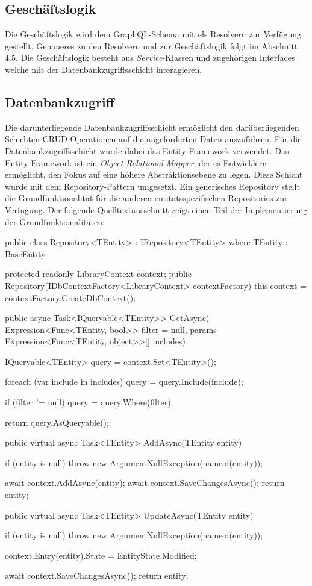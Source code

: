 \subsection{Geschäftslogik}
Die Geschäftslogik wird dem GraphQL-Schema mittels Resolvern zur Verfügung gestellt.
Genaueres zu den Resolvern und zur Geschäftslogik folgt im Abschnitt 4.5.
Die Geschäftslogik besteht aus \textit{Service}-Klassen und zugehörigen Interfaces welche mit der Datenbankzugriffsschicht interagieren.

\subsection{Datenbankzugriff}
Die darunterliegende Datenbankzugriffsschicht ermöglicht den darüberliegenden Schichten CRUD-Operationen auf die angeforderten Daten auszuführen.
Für die Datenbankzugriffsschicht wurde dabei das Entity Framework verwendet.
Das Entity Framework ist ein \textit{Object Relational Mapper}, der es Entwicklern ermöglicht, den Fokus auf eine höhere Abstraktionsebene zu legen.
Diese Schicht wurde mit dem Repository-Pattern umgesetzt.
Ein generisches Repository stellt die Grundfunktionalität für die anderen entitätsspezifischen Repositories zur Verfügung.
Der folgende Quelltextausschnitt zeigt einen Teil der Implementierung der Grundfunktionalitäten:
\begin{JsCode}
public class Repository<TEntity> : IRepository<TEntity> where TEntity : BaseEntity {
    protected readonly LibraryContext context;
    public Repository(IDbContextFactory<LibraryContext> contextFactory) {
        this.context = contextFactory.CreateDbContext();
    }

    public async Task<IQueryable<TEntity>> GetAsync(
        Expression<Func<TEntity, bool>> filter = null,
        params Expression<Func<TEntity, object>>[] includes)
    {
        IQueryable<TEntity> query = context.Set<TEntity>();

        foreach (var include in includes) {
            query = query.Include(include);
        }

        if (filter != null) {
            query = query.Where(filter);
        }

        return query.AsQueryable();
    }

    public virtual async Task<TEntity> AddAsync(TEntity entity) {
        if (entity is null) {
            throw new ArgumentNullException(nameof(entity));
        }

        await context.AddAsync(entity);
        await context.SaveChangesAsync();
        return entity;
    }

    public virtual async Task<TEntity> UpdateAsync(TEntity entity) {
        if (entity is null) {
            throw new ArgumentNullException(nameof(entity));
        }

        context.Entry(entity).State = EntityState.Modified;

        await context.SaveChangesAsync();
        return entity;
    }
}
\end{JsCode}

